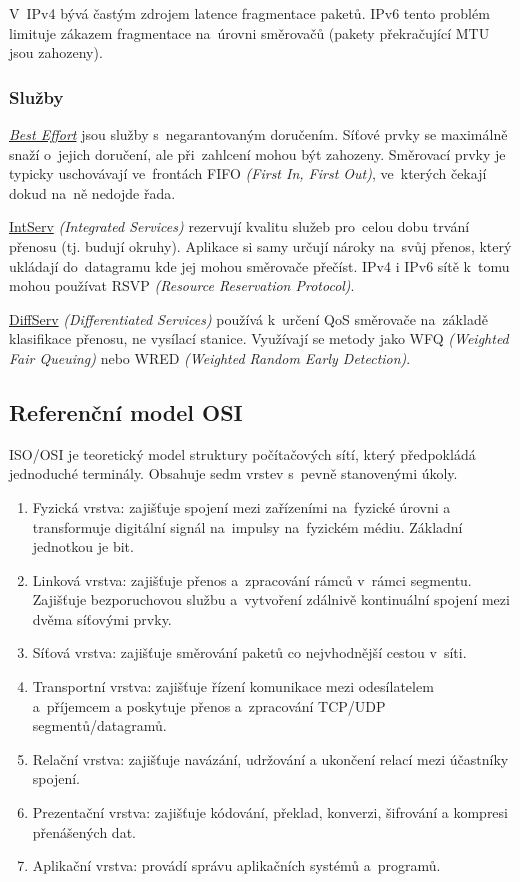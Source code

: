 V~IPv4 bývá častým zdrojem latence fragmentace paketů.
IPv6 tento problém limituje zákazem fragmentace na~úrovni směrovačů (pakety překračující MTU jsou zahozeny).


\subsubsection{Služby}

\underline{\emph{Best Effort}} jsou služby s~negarantovaným doručením.
Síťové prvky se maximálně snaží o~jejich doručení, ale při~zahlcení mohou být zahozeny.
Směrovací prvky je typicky uschovávají ve~frontách FIFO \emph{(First In, First Out)}, ve~kterých čekají dokud na~ně nedojde řada.

\underline{IntServ} \emph{(Integrated Services)} rezervují kvalitu služeb pro~celou dobu trvání přenosu (tj. budují okruhy).
Aplikace si samy určují nároky na~svůj přenos, který ukládají do~datagramu kde jej mohou směrovače přečíst.
IPv4 i IPv6 sítě k~tomu mohou používat RSVP \emph{(Resource Reservation Protocol)}.

\underline{DiffServ} \emph{(Differentiated Services)} používá k~určení QoS směrovače na~základě klasifikace přenosu, ne vysílací stanice.
Využívají se metody jako WFQ \emph{(Weighted Fair Queuing)} nebo WRED \emph{(Weighted Random Early Detection)}.


\subsection{Referenční model OSI}

ISO/OSI je teoretický model struktury počítačových sítí, který předpokládá jednoduché terminály.
Obsahuje sedm vrstev s~pevně stanovenými úkoly.

\begin{enumerate}
\item
    Fyzická vrstva:
    zajišťuje spojení mezi zařízeními na~fyzické úrovni a transformuje digitální signál na~impulsy na~fyzickém médiu.
    Základní jednotkou je bit.
\item
    Linková vrstva:
    zajišťuje přenos a~zpracování rámců v~rámci segmentu.
    Zajišťuje bezporuchovou službu a~vytvoření zdálnivě kontinuální spojení mezi dvěma síťovými prvky.
\item
    Síťová vrstva:
    zajišťuje směrování paketů co nejvhodnější cestou v~síti.
\item
    Transportní vrstva:
    zajišťuje řízení komunikace mezi odesílatelem a~příjemcem a poskytuje přenos a~zpracování TCP/UDP segmentů/datagramů.
\item
    Relační vrstva:
    zajišťuje navázání, udržování a ukončení relací mezi účastníky spojení.
\item
    Prezentační vrstva:
    zajišťuje kódování, překlad, konverzi, šifrování a kompresi přenášených dat.
\item
    Aplikační vrstva:
    provádí správu aplikačních systémů a~programů.
\end{enumerate}
\FloatBarrier


